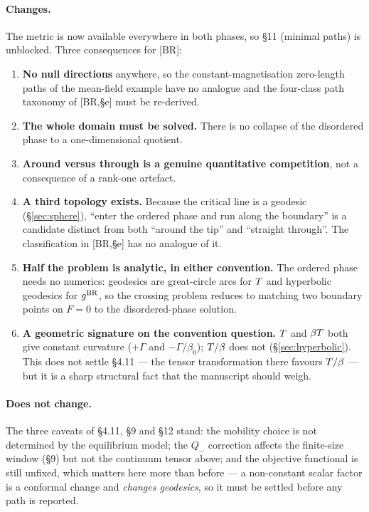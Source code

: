 \paragraph{Changes.} The metric is now available everywhere in both phases, so \S11 (minimal
paths) is unblocked. Three consequences for [BR]:
\begin{enumerate}
  \item \textbf{No null directions} anywhere, so the constant-magnetisation zero-length paths
        of the mean-field example have no analogue and the four-class path taxonomy of
        [BR,\S e] must be re-derived.
  \item \textbf{The whole domain must be solved.} There is no collapse of the disordered
        phase to a one-dimensional quotient.
  \item \textbf{Around versus through is a genuine quantitative competition}, not a
        consequence of a rank-one artefact.
  \item \textbf{A third topology exists.} Because the critical line is a geodesic
        (\S\ref{sec:sphere}), ``enter the ordered phase and run along the boundary'' is a
        candidate distinct from both ``around the tip'' and ``straight through''. The
        classification in [BR,\S e] has no analogue of it.
  \item \textbf{Half the problem is analytic, in either convention.} The ordered phase needs
        no numerics: geodesics are great-circle arcs for $T$ and hyperbolic geodesics for
        $g^{\rm BR}$, so the crossing problem reduces to matching two boundary points on
        $F=0$ to the disordered-phase solution.
  \item \textbf{A geometric signature on the convention question.} $T$ and $\beta T$ both
        give constant curvature ($+\Gamma$ and $-\Gamma/\beta_0$); $T/\beta$ does not
        (\S\ref{sec:hyperbolic}). This does not settle \S4.11 --- the tensor transformation
        there favours $T/\beta$ --- but it is a sharp structural fact that the manuscript
        should weigh.
\end{enumerate}

\paragraph{Does not change.} The three caveats of \S4.11, \S9 and \S12 stand:
the mobility choice is not determined by the equilibrium model; the $Q_-$ correction affects
the finite-size window (\S9) but not the continuum tensor above; and the objective functional
is still unfixed, which matters here more than before --- a non-constant scalar factor is a
conformal change and \emph{changes geodesics}, so it must be settled before any path is
reported.


	